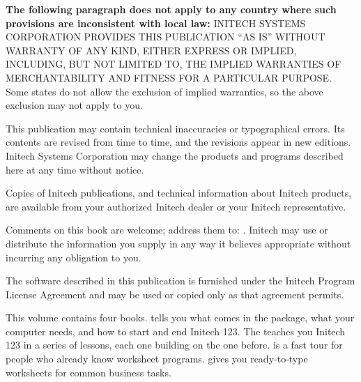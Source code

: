 \begin{TitleVerso}
\IsThisGoodForTheCompany\par
{\imLegalFont
\textbf{The following paragraph does not apply to any country where such
provisions are inconsistent with local law:} INITECH SYSTEMS CORPORATION
PROVIDES THIS PUBLICATION ``AS IS'' WITHOUT WARRANTY OF ANY KIND, EITHER
EXPRESS OR IMPLIED, INCLUDING, BUT NOT LIMITED TO, THE IMPLIED WARRANTIES OF
MERCHANTABILITY AND FITNESS FOR A PARTICULAR PURPOSE.  Some states do not
allow the exclusion of implied warranties, so the above exclusion may not
apply to you.\par
This publication may contain technical inaccuracies or typographical errors.
Its contents are revised from time to time, and the revisions appear in new
editions.  Initech Systems Corporation may change the products and programs
described here at any time without notice.\par
Copies of Initech publications, and technical information about Initech
products, are available from your authorized Initech dealer or your Initech
representative.\par}

{\footnotesize
Comments on this book are welcome; address them to: \InitechAddressLine.
Initech may use or distribute the information you supply in any way it
believes appropriate without incurring any obligation to you.\par
The software described in this publication is furnished under the Initech
Program License Agreement and may be used or copied only as that agreement
permits.\par}
\end{TitleVerso}

This volume contains four books.   tells you
what comes in the package, what your computer needs, and how to start and
end Initech 123.  The  teaches you Initech 123 in a series
of lessons, each one building on the one before.   is
a fast tour for people who already know worksheet programs.   gives you ready-to-type worksheets for common business tasks.

